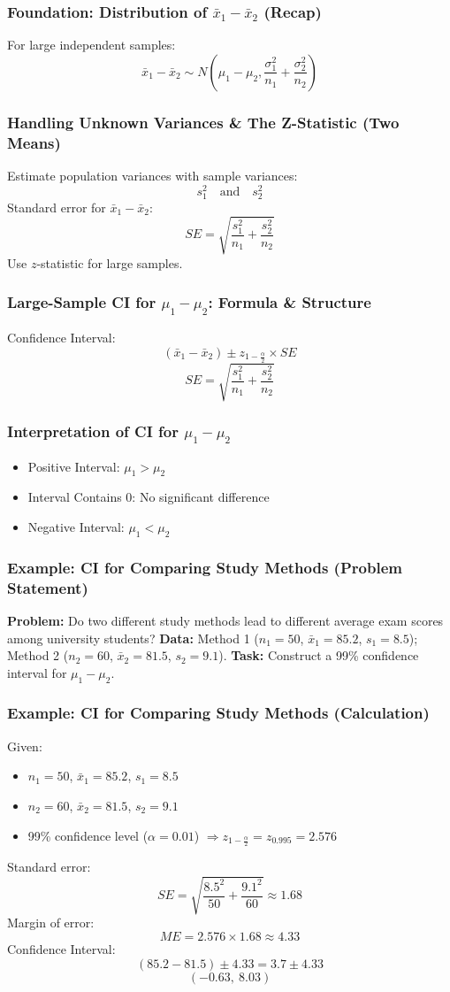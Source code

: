 \documentclass[handout]{beamer}
\begin{document}
\begin{frame}
\frametitle{Foundation: Distribution of $\bar{x}_1 - \bar{x}_2$ (Recap)}
For large independent samples:
\[ \bar{x}_1 - \bar{x}_2 \sim N\left(\mu_1 - \mu_2, \frac{\sigma_1^2}{n_1} + \frac{\sigma_2^2}{n_2}\right) \]
\end{frame}

\begin{frame}
\frametitle{Handling Unknown Variances \& The Z-Statistic (Two Means)}
Estimate population variances with sample variances:
\[ s_1^2 \quad \text{and} \quad s_2^2 \]
Standard error for $\bar{x}_1 - \bar{x}_2$:
\[ SE = \sqrt{\frac{s_1^2}{n_1} + \frac{s_2^2}{n_2}} \]
Use $z$-statistic for large samples.
\end{frame}

\begin{frame}
\frametitle{Large-Sample CI for $\mu_1 - \mu_2$: Formula \& Structure}
Confidence Interval:
\[ (\bar{x}_1 - \bar{x}_2) \pm z_{1-\frac{\alpha}{2}} \times SE \]
\[ SE = \sqrt{\frac{s_1^2}{n_1} + \frac{s_2^2}{n_2}} \]
\end{frame}

\begin{frame}
\frametitle{Interpretation of CI for $\mu_1 - \mu_2$}
\begin{itemize}
\item Positive Interval: $\mu_1 > \mu_2$
\item Interval Contains 0: No significant difference
\item Negative Interval: $\mu_1 < \mu_2$
\end{itemize}
\end{frame}

\begin{frame}
\frametitle{Example: CI for Comparing Study Methods (Problem Statement)}
\textbf{Problem:} Do two different study methods lead to different average exam scores among university students? \newline
\textbf{Data:} Method 1 ($n_1=50$, $\bar{x}_1=85.2$, $s_1=8.5$); Method 2 ($n_2=60$, $\bar{x}_2=81.5$, $s_2=9.1$). \newline
\textbf{Task:} Construct a 99\% confidence interval for $\mu_1 - \mu_2$.
\end{frame}

\begin{frame}
\frametitle{Example: CI for Comparing Study Methods (Calculation)}
Given:
\begin{itemize}
\item $n_1=50$, $\bar{x}_1=85.2$, $s_1=8.5$
\item $n_2=60$, $\bar{x}_2=81.5$, $s_2=9.1$
\item 99\% confidence level ($\alpha=0.01$) $\Rightarrow z_{1-\frac{\alpha}{2}} = z_{0.995} = 2.576$
\end{itemize}
Standard error:
\[ SE = \sqrt{\frac{8.5^2}{50} + \frac{9.1^2}{60}} \approx 1.68 \]
Margin of error:
\[ ME = 2.576 \times 1.68 \approx 4.33 \]
Confidence Interval:
\[ (85.2 - 81.5) \pm 4.33 = 3.7 \pm 4.33 \]
\[ (-0.63,\ 8.03) \]
\end{frame}
\end{document}
